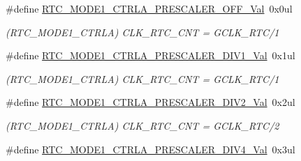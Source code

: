 \begin{DoxyCompactItemize}
\item 
\hypertarget{group___s_a_m_l21___r_t_c_gac6f78ba4aa55c531dfd22573b9e2cebc}{}\#define \hyperlink{group___s_a_m_l21___r_t_c_gac6f78ba4aa55c531dfd22573b9e2cebc}{R\+T\+C\+\_\+\+M\+O\+D\+E1\+\_\+\+C\+T\+R\+L\+A\+\_\+\+P\+R\+E\+S\+C\+A\+L\+E\+R\+\_\+\+O\+F\+F\+\_\+\+Val}~0x0ul\label{group___s_a_m_l21___r_t_c_gac6f78ba4aa55c531dfd22573b9e2cebc}

\begin{DoxyCompactList}\small\item\em (R\+T\+C\+\_\+\+M\+O\+D\+E1\+\_\+\+C\+T\+R\+L\+A) C\+L\+K\+\_\+\+R\+T\+C\+\_\+\+C\+N\+T = G\+C\+L\+K\+\_\+\+R\+T\+C/1 \end{DoxyCompactList}\item 
\hypertarget{group___s_a_m_l21___r_t_c_ga2ca09a8ded8415bd77a8cef4da165286}{}\#define \hyperlink{group___s_a_m_l21___r_t_c_ga2ca09a8ded8415bd77a8cef4da165286}{R\+T\+C\+\_\+\+M\+O\+D\+E1\+\_\+\+C\+T\+R\+L\+A\+\_\+\+P\+R\+E\+S\+C\+A\+L\+E\+R\+\_\+\+D\+I\+V1\+\_\+\+Val}~0x1ul\label{group___s_a_m_l21___r_t_c_ga2ca09a8ded8415bd77a8cef4da165286}

\begin{DoxyCompactList}\small\item\em (R\+T\+C\+\_\+\+M\+O\+D\+E1\+\_\+\+C\+T\+R\+L\+A) C\+L\+K\+\_\+\+R\+T\+C\+\_\+\+C\+N\+T = G\+C\+L\+K\+\_\+\+R\+T\+C/1 \end{DoxyCompactList}\item 
\hypertarget{group___s_a_m_l21___r_t_c_gaec263d559b4e4af4ed131f94fcee777b}{}\#define \hyperlink{group___s_a_m_l21___r_t_c_gaec263d559b4e4af4ed131f94fcee777b}{R\+T\+C\+\_\+\+M\+O\+D\+E1\+\_\+\+C\+T\+R\+L\+A\+\_\+\+P\+R\+E\+S\+C\+A\+L\+E\+R\+\_\+\+D\+I\+V2\+\_\+\+Val}~0x2ul\label{group___s_a_m_l21___r_t_c_gaec263d559b4e4af4ed131f94fcee777b}

\begin{DoxyCompactList}\small\item\em (R\+T\+C\+\_\+\+M\+O\+D\+E1\+\_\+\+C\+T\+R\+L\+A) C\+L\+K\+\_\+\+R\+T\+C\+\_\+\+C\+N\+T = G\+C\+L\+K\+\_\+\+R\+T\+C/2 \end{DoxyCompactList}\item 
\hypertarget{group___s_a_m_l21___r_t_c_ga7ef0ca9e6f3f650b96005ab5dce607f9}{}\#define \hyperlink{group___s_a_m_l21___r_t_c_ga7ef0ca9e6f3f650b96005ab5dce607f9}{R\+T\+C\+\_\+\+M\+O\+D\+E1\+\_\+\+C\+T\+R\+L\+A\+\_\+\+P\+R\+E\+S\+C\+A\+L\+E\+R\+\_\+\+D\+I\+V4\+\_\+\+Val}~0x3ul\label{group___s_a_m_l21___r_t_c_ga7ef0ca9e6f3f650b96005ab5dce607f9}


\end{DoxyCompactItemize}
